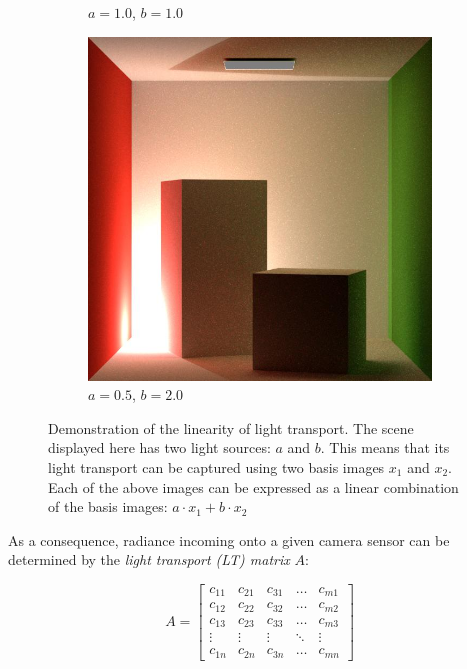 \begin{figure}[ht]
\begin{subfigure}[b]{0.24\textwidth}
        \caption*{\(a = 1.0\), \(b = 1.0\)}
    \end{subfigure}
    \hfill
    \begin{subfigure}[b]{0.24\textwidth}
        \centering
        \includegraphics[width=\textwidth]{images/02-linear_lt_comb2.jpg}
        \caption*{\(a = 0.5\), \(b = 2.0\)}
    \end{subfigure}
    \caption{Demonstration of the linearity of light transport. The scene displayed here has two light sources: \(a\) and \(b\). This means that its light transport can be captured using two basis images \(x_1\) and \(x_2\). Each of the above images can be expressed as a linear combination of the basis images: \(a \cdot x_1 + b \cdot x_2\)}
    \label{fig:background_linear_lt}
\end{figure}

As a consequence, radiance incoming onto a given camera sensor can be determined by the \textit{light transport (LT) matrix} \(A\):

\begin{equation}
    \label{eq:lt_matrix}
    A = \begin{bmatrix}
        c_{11} & c_{21} & c_{31} & \dots & c_{m1} \\
        c_{12} & c_{22} & c_{32} & \dots & c_{m2} \\
        c_{13} & c_{23} & c_{33} & \dots & c_{m3} \\
        \vdots & \vdots & \vdots & \ddots & \vdots \\
        c_{1n} & c_{2n} & c_{3n} & \dots & c_{mn}
    \end{bmatrix}
\end{equation}

